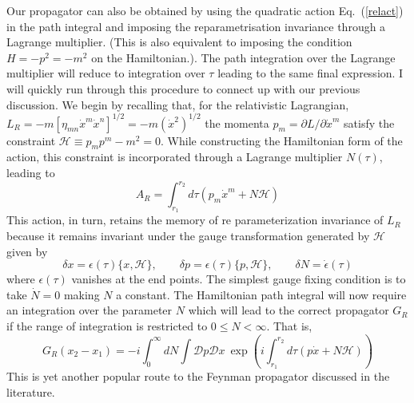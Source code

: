\documentclass{article}
\def\eq#1{{Eq.~(\ref{#1})}}
\begin{document}
Our propagator can also be obtained by using the quadratic action  \eq{relact} in the path integral and imposing the reparametrisation invariance through a Lagrange multiplier. (This is also equivalent to imposing the condition $H=-p^2=-m^2$ on the Hamiltonian.). The path integration over the Lagrange multiplier will reduce to integration over $\tau$ leading to the same final expression.
I will quickly run through this procedure \cite{C1,C2a,C2b} to connect up with our previous discussion. 
  We begin by recalling that, for the relativistic Lagrangian,
 $
 L_R = - m \left[ \eta_{mn} \dot x^m \dot x^n\right]^{1/2} = - m(\dot x^2)^{1/2}
 $ 
 the momenta $p_m = \partial L/\partial \dot x^m$ satisfy the constraint $\mathcal{H} \equiv p_m p^m - m^2 = 0$. While constructing the Hamiltonian form of the action, this constraint is incorporated through a Lagrange multiplier $N(\tau)$, leading to  
 \begin{equation}
 A_R = \int_{r_1}^{r_2} d\tau \left( p_m \dot x^m + N \mathcal{H}\right)
 \end{equation} 
 This action, in turn, retains the memory of re parameterization invariance of $L_R$ because it remains invariant under the gauge transformation generated by $\mathcal{H}$ given by 
 \begin{equation}
 \delta x = \epsilon(\tau) \{ x, \mathcal{H}\}, \qquad \delta p = \epsilon(\tau) \{ p , \mathcal{H}\}, \qquad \delta N = \dot \epsilon(\tau)
 \end{equation} 
 where $\epsilon(\tau)$ vanishes at the end points. The simplest gauge fixing condition \cite{3ofa} is to take $\dot N =0$ making $N$ a constant. The Hamiltonian path integral will now require an integration over the parameter $N$ which will lead to the correct propagator $G_R$ if the range of integration is restricted to $0\le N< \infty$. That is, 
 \begin{equation}
 G_R(x_2-x_1) = - i \int_0^\infty  dN\int \mathcal{D}p \mathcal{D}x \ \exp \left( i \int_{r_1}^{r_2} d\tau \left( p \dot x + N \mathcal{H}\right)\right)
 \end{equation} 
This is yet another popular route to the Feynman propagator discussed in the literature. 
\end{document}
